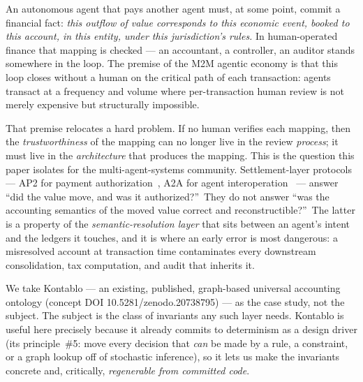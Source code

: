 \documentclass[11pt]{clapps}  %
\begin{document}
An autonomous agent that pays another agent must, at some point, commit a
financial fact: \emph{this outflow of value corresponds to this economic event,
booked to this account, in this entity, under this jurisdiction's rules.} In
human-operated finance that mapping is checked --- an accountant, a controller,
an auditor stands somewhere in the loop. The premise of the M2M agentic economy
is that this loop closes without a human on the critical path of each
transaction: agents transact at a frequency and volume where per-transaction
human review is not merely expensive but structurally impossible.

That premise relocates a hard problem. If no human verifies each mapping, then
the \emph{trustworthiness} of the mapping can no longer live in the review
\emph{process}; it must live in the \emph{architecture} that produces the
mapping. This is the question this paper isolates for the multi-agent-systems
community. Settlement-layer protocols --- AP2 for payment
authorization~\cite{ap2_spec}, A2A for agent interoperation~\cite{a2a_spec} ---
answer ``did the value move, and was it
authorized?''\ They do not answer ``was the accounting semantics of the moved
value correct and reconstructible?''\ The latter is a property of the
\emph{semantic-resolution layer} that sits between an agent's intent and the
ledgers it touches, and it is where an early error is most dangerous: a
misresolved account at transaction time contaminates every downstream
consolidation, tax computation, and audit that inherits it.

We take Kontablo --- an existing, published, graph-based universal accounting
ontology (concept DOI 10.5281/zenodo.20738795) --- as the case study, not the
subject. The subject is the class of invariants any such layer needs. Kontablo
is useful here precisely because it already commits to determinism as a design
driver (its principle~\#5: move every decision that \emph{can} be made by a
rule, a constraint, or a graph lookup off of stochastic inference), so it lets
us make the invariants concrete and, critically, \emph{regenerable from
committed code}.


\end{document}
